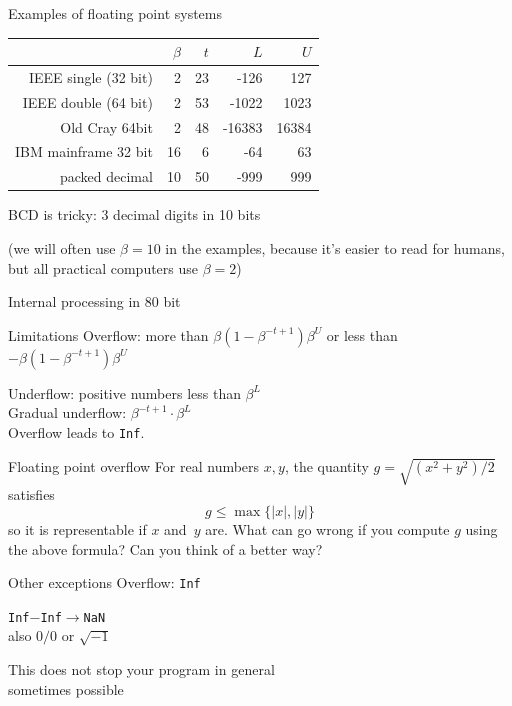 \begin{numberedframe}{Examples of floating point systems}

  \begin{tabular}{rrrrr}
    \toprule
    &$\beta$&$t$&$L$&$U$\\
    \midrule
    IEEE single (32 bit)&2&23&-126&127\\
    IEEE double (64 bit)&2&53&-1022&1023\\
    Old Cray 64bit&2&48&-16383&16384\\
    IBM mainframe 32 bit&16&6&-64&63\\
    packed decimal&10&50&-999&999\\
    \bottomrule
  \end{tabular}
  
  BCD is tricky: 3 decimal digits in 10 bits

  (we will often use $\beta=10$ in the examples, because it's easier to
  read for humans, but all practical computers use $\beta=2$)

  Internal processing in 80 bit
\end{numberedframe}

\begin{numberedframe}{Limitations}
  Overflow:
  more than $\beta(1-\beta^{-t+1}) \beta^U$ or less than
  $-\beta(1-\beta^{-t+1}) \beta^U$

  Underflow: positive numbers less than $\beta^L$\\
  Gradual underflow: $\beta^{-t+1}\cdot \beta^L$\\

  Overflow leads to \texttt{Inf}.
\end{numberedframe}


\begin{exerciseframe}{Floating point overflow}
  For real numbers $x,y$, the quantity $g=\sqrt{(x^2+y^2)/2}$ satisfies
  \[ g\leq \max\{|x|,|y|\} \]
  so it is representable if $x$ and~$y$ are.
  What can go wrong if you compute $g$ using the above formula?
  Can you think of a better way?
\end{exerciseframe}

\begin{numberedframe}{Other exceptions}
  Overflow: \texttt{Inf}

  \texttt{Inf}$-$\texttt{Inf}$\rightarrow$\texttt{NaN}\\
  also $0/0$ or $\sqrt{-1}$

  This does not stop your program in general\\
  sometimes possible
\end{numberedframe}

